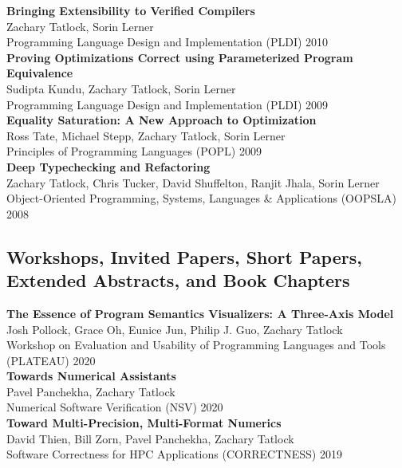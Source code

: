 \documentclass[10pt]{article}
\begin{document}
\textbf{%
Bringing Extensibility to Verified Compilers
} \\
Zachary Tatlock, Sorin Lerner \\
Programming Language Design and Implementation (PLDI) 2010 \\

\textbf{%
Proving Optimizations Correct using Parameterized Program Equivalence
} \\
Sudipta Kundu, Zachary Tatlock, Sorin Lerner \\
Programming Language Design and Implementation (PLDI) 2009 \\

\textbf{%
Equality Saturation: A New Approach to Optimization
} \\
Ross Tate, Michael Stepp, Zachary Tatlock, Sorin Lerner \\
Principles of Programming Languages (POPL) 2009 \\

\textbf{%
Deep Typechecking and Refactoring
} \\
Zachary Tatlock, Chris Tucker, David Shuffelton, Ranjit Jhala, Sorin Lerner \\
Object-Oriented Programming, Systems, Languages \& Applications (OOPSLA) 2008


\subsection*{Workshops, Invited Papers, Short Papers, Extended Abstracts, and Book Chapters}

\textbf{%
  The Essence of Program Semantics Visualizers: A Three-Axis Model
} \\
Josh Pollock, Grace Oh, Eunice Jun, Philip J. Guo, Zachary Tatlock \\
Workshop on Evaluation and Usability of Programming Languages and Tools (PLATEAU) 2020 \\

\textbf{%
  Towards Numerical Assistants
} \\
Pavel Panchekha, Zachary Tatlock \\
Numerical Software Verification (NSV) 2020 \\

\textbf{%
Toward Multi-Precision, Multi-Format Numerics
} \\
David Thien, Bill Zorn, Pavel Panchekha, Zachary Tatlock \\
Software Correctness for HPC Applications (CORRECTNESS) 2019 \\
\end{document}
